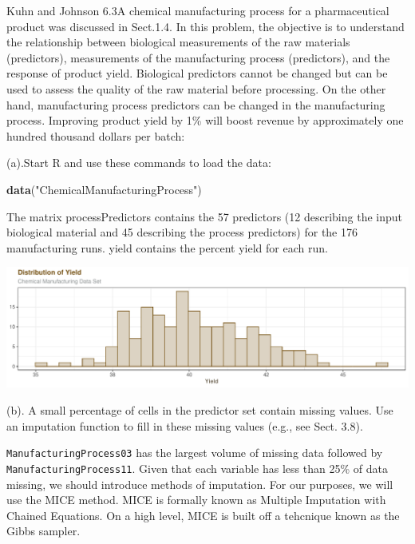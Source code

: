 \documentclass[]{report}
\newenvironment{Shaded}{\begin{snugshade}}{\end{snugshade}}
\newcommand{\KeywordTok}[1]{\textcolor[rgb]{0.13,0.29,0.53}{\textbf{#1}}}
\newcommand{\NormalTok}[1]{#1}
\newcommand{\StringTok}[1]{\textcolor[rgb]{0.31,0.60,0.02}{#1}}
\begin{document}

\begin{question}{Kuhn and Johnson 6.3}A chemical manufacturing process for a pharmaceutical product was discussed in Sect.1.4. In this problem, the objective is to understand the relationship between biological measurements of the raw materials (predictors), measurements of the manufacturing process (predictors), and the response of product yield. Biological predictors cannot be changed but can be used to assess the quality of the raw material before processing. On the other hand, manufacturing process predictors can be changed in the manufacturing process. Improving product yield by 1\% will boost revenue by approximately one hundred thousand dollars per batch:\end{question}

\begin{subquestion}{(a).}Start R and use these commands to load the data:
\end{subquestion}

\begin{Shaded}
\begin{Highlighting}[]
\KeywordTok{data}\NormalTok{(}\StringTok{"ChemicalManufacturingProcess"}\NormalTok{)}
\end{Highlighting}
\end{Shaded}

The matrix processPredictors contains the 57 predictors (12 describing
the input biological material and 45 describing the process predictors)
for the 176 manufacturing runs. yield contains the percent yield for
each run.

\includegraphics{Homework-Two_files/figure-latex/kj-6.3a-plot-1.pdf}

\begin{subquestion}{(b).} A small percentage of cells in the predictor set contain missing values. Use an imputation function to fill in these missing values (e.g., see Sect. 3.8). 
\end{subquestion}

\texttt{ManufacturingProcess03} has the largest volume of missing data
followed by \texttt{ManufacturingProcess11}. Given that each variable
has less than 25\% of data missing, we should introduce methods of
imputation. For our purposes, we will use the MICE method. MICE is
formally known as Multiple Imputation with Chained Equations. On a high
level, MICE is built off a tehcnique known as the Gibbs sampler.
\end{document}
